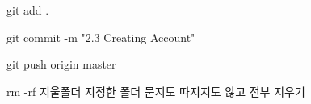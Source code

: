 git add .

git commit -m "2.3 Creating Account"

git push origin master

rm -rf 지울폴더
지정한 폴더 묻지도 따지지도 않고 전부 지우기